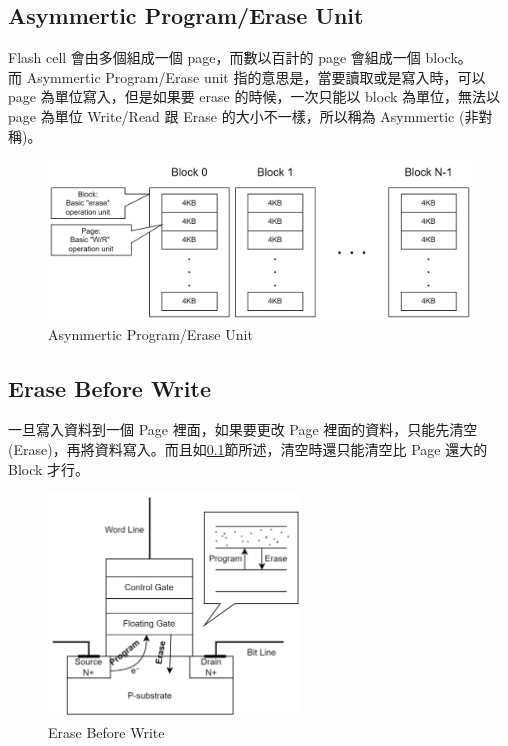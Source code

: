 \subsection{Asymmertic Program/Erase Unit}\label{s2.1.2}
\indent
Flash cell 會由多個組成一個 page，而數以百計的 page 會組成一個 block。\\
而 Asymmertic Program/Erase unit 指的意思是，當要讀取或是寫入時，可以 page 為單位寫入，但是如果要 erase 的時候，一次只能以 block 為單位，無法以 page 為單位 Write/Read 跟 Erase 的大小不一樣，所以稱為 Asymmertic (非對稱)。
\begin{figure}[H]
    \centering
    \includegraphics[width=1\textwidth]{picture/ch2/Asymmertic_P-E_unit.png}
    \caption{Asymmertic Program/Erase Unit}
    \label{f2.1}
\end{figure}

\subsection{Erase Before Write}\label{s2.1.3}
\indent
一旦寫入資料到一個 Page 裡面，如果要更改 Page 裡面的資料，只能先清空(Erase)，再將資料寫入。而且如\ref{s2.1.2}節所述，清空時還只能清空比 Page 還大的 Block 才行。\cite{SRFTL}
\begin{figure}[H]
    \centering
    \includegraphics[width=0.6\textwidth]{picture/ch2/erase_before_write.png}
    \caption{Erase Before Write}
    \label{f2.2}
\end{figure}

